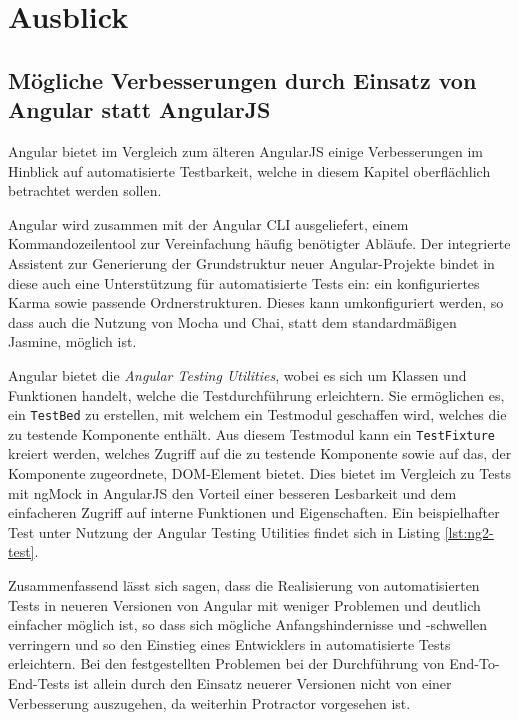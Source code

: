 \section{Ausblick}
\subsection{Mögliche Verbesserungen durch Einsatz von Angular statt AngularJS}
Angular bietet im Vergleich zum älteren AngularJS einige Verbesserungen im Hinblick auf automatisierte Testbarkeit, welche in diesem Kapitel oberflächlich betrachtet werden sollen.

Angular wird zusammen mit der Angular CLI ausgeliefert, einem Kommandozeilentool zur Vereinfachung häufig benötigter Abläufe. Der integrierte Assistent zur Generierung der Grundstruktur neuer Angular-Projekte bindet in diese auch eine Unterstützung für automatisierte Tests ein: ein konfiguriertes Karma sowie passende Ordnerstrukturen. Dieses kann umkonfiguriert werden, so dass auch die Nutzung von Mocha und Chai, statt dem standardmäßigen Jasmine, möglich ist. \cite{ng2-cli}

Angular bietet die \textit{Angular Testing Utilities}, wobei es sich um Klassen und Funktionen handelt, welche die Testdurchführung erleichtern. Sie ermöglichen es, ein \texttt{TestBed} zu erstellen, mit welchem ein Testmodul geschaffen wird, welches die zu testende Komponente enthält. Aus diesem Testmodul kann ein \texttt{TestFixture} kreiert werden, welches Zugriff auf die zu testende Komponente sowie auf das, der Komponente zugeordnete, DOM-Element bietet. Dies bietet im Vergleich zu Tests mit ngMock in AngularJS den Vorteil einer besseren Lesbarkeit und dem einfacheren Zugriff auf interne Funktionen und Eigenschaften. Ein beispielhafter Test unter Nutzung der Angular Testing Utilities findet sich in Listing \ref{lst:ng2-test}.  \cite{ng2-test}

Zusammenfassend lässt sich sagen, dass die Realisierung von automatisierten Tests in neueren Versionen von Angular mit weniger Problemen und deutlich einfacher möglich ist, so dass sich mögliche Anfangshindernisse und -schwellen verringern und so den Einstieg eines Entwicklers in automatisierte Tests erleichtern. Bei den festgestellten Problemen bei der Durchführung von End-To-End-Tests ist allein durch den Einsatz neuerer Versionen nicht von einer Verbesserung auszugehen, da weiterhin Protractor vorgesehen ist.

\begin{figure}[H]
	
\end{figure}

